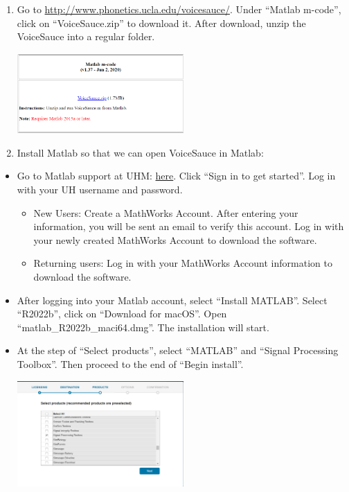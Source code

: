 \documentclass[
]{article}
\providecommand{\tightlist}{%
  \setlength{\itemsep}{0pt}\setlength{\parskip}{0pt}}
\begin{document}
\begin{enumerate}
\def\labelenumi{\arabic{enumi}.}
\tightlist
\item
  Go to \url{http://www.phonetics.ucla.edu/voicesauce/}. Under ``Matlab
  m-code'', click on ``VoiceSauce.zip'' to download it. After download,
  unzip the VoiceSauce into a regular folder.

  \includegraphics[width=0.5\textwidth,height=\textheight]{image/vs_matlabzip.png}
\item
  Install Matlab so that we can open VoiceSauce in Matlab:
\end{enumerate}

\begin{itemize}
\tightlist
\item
  Go to Matlab support at UHM:
  \href{https://www.mathworks.com/academia/tah-portal/university-of-hawaii-manoa-40591263.html}{here}.
  Click ``Sign in to get started''. Log in with your UH username and
  password.

  \begin{itemize}
  \tightlist
  \item
    New Users: Create a MathWorks Account. After entering your
    information, you will be sent an email to verify this account. Log
    in with your newly created MathWorks Account to download the
    software.
  \item
    Returning users: Log in with your MathWorks Account information to
    download the software.
  \end{itemize}
\item
  After logging into your Matlab account, select ``Install MATLAB''.
  Select ``R2022b'', click on ``Download for macOS''. Open
  ``matlab\_R2022b\_maci64.dmg''. The installation will start.
\item
  At the step of ``Select products'', select ``MATLAB'' and ``Signal
  Processing Toolbox''. Then proceed to the end of ``Begin install''.

  \includegraphics[width=0.5\textwidth,height=\textheight]{image/vs_mltoolbox.png}
\end{itemize}
\end{document}
